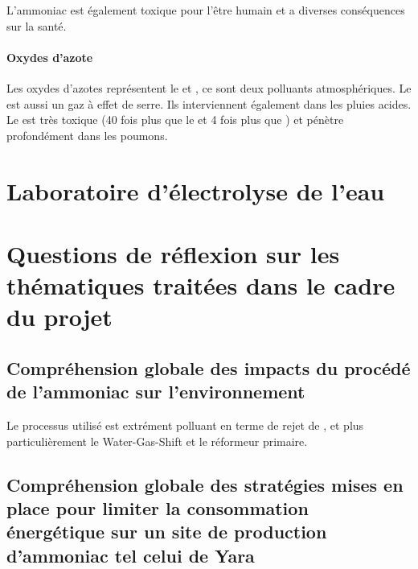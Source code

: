 L'ammoniac est également toxique pour l'être humain et a
diverses conséquences sur la santé.
\paragraph{Oxydes d'azote} Les oxydes d'azotes 
représentent le  et , ce sont
deux polluants atmosphériques. Le  est aussi
un gaz à effet de serre. Ils interviennent également
dans les pluies acides.
Le  est très toxique (40 fois plus que le
 et 4 fois plus que ) et
pénètre profondément dans les poumons.

\section{Laboratoire d'électrolyse de l'eau}

\section{Questions de réflexion sur les thématiques traitées
dans le cadre du projet}
\subsection{Compréhension globale des impacts du procédé de l'ammoniac sur l'environnement}
Le processus utilisé est extrément polluant en terme de rejet de , et
plus particulièrement le Water-Gas-Shift et le réformeur primaire.
\subsection{Compréhension globale des stratégies mises en place pour limiter la consommation 
énergétique sur un site de production d'ammoniac tel celui de Yara}

